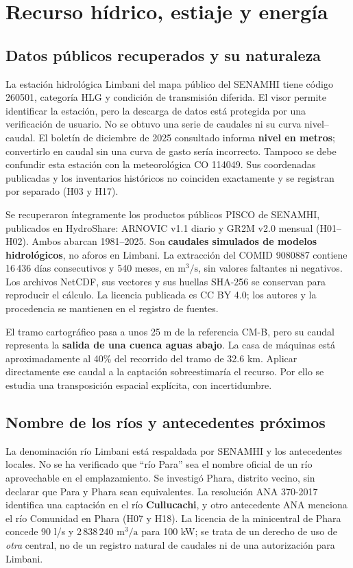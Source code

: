 \chapter{Recurso hídrico, estiaje y energía}
\section{Datos públicos recuperados y su naturaleza}
La estación hidrológica Limbani del mapa público del SENAMHI tiene código 260501, categoría HLG y condición de transmisión diferida. El visor permite identificar la estación, pero la descarga de datos está protegida por una verificación de usuario. No se obtuvo una serie de caudales ni su curva nivel--caudal. El boletín de diciembre de 2025 consultado informa \textbf{nivel en metros}; convertirlo en caudal sin una curva de gasto sería incorrecto. Tampoco se debe confundir esta estación con la meteorológica CO 114049. Sus coordenadas publicadas y los inventarios históricos no coinciden exactamente y se registran por separado (H03 y H17).

Se recuperaron íntegramente los productos públicos PISCO de SENAMHI, publicados en HydroShare: ARNOVIC v1.1 diario y GR2M v2.0 mensual (H01--H02). Ambos abarcan 1981--2025. Son \textbf{caudales simulados de modelos hidrológicos}, no aforos en Limbani. La extracción del COMID 9080887 contiene 16\,436 días consecutivos y 540 meses, en \(\mathrm{m^3/s}\), sin valores faltantes ni negativos. Los archivos NetCDF, sus vectores y sus huellas SHA-256 se conservan para reproducir el cálculo. La licencia publicada es CC BY 4.0; los autores y la procedencia se mantienen en el registro de fuentes.

El tramo cartográfico pasa a unos 25 m de la referencia CM-B, pero su caudal representa la \textbf{salida de una cuenca aguas abajo}. La casa de máquinas está aproximadamente al 40\% del recorrido del tramo de 32.6 km. Aplicar directamente ese caudal a la captación sobreestimaría el recurso. Por ello se estudia una transposición espacial explícita, con incertidumbre.

\section{Nombre de los ríos y antecedentes próximos}
La denominación río Limbani está respaldada por SENAMHI y los antecedentes locales. No se ha verificado que ``río Para'' sea el nombre oficial de un río aprovechable en el emplazamiento. Se investigó Phara, distrito vecino, sin declarar que Para y Phara sean equivalentes. La resolución ANA 370-2017 identifica una captación en el río \textbf{Cullucachi}, y otro antecedente ANA menciona el río Comunidad en Phara (H07 y H18). La licencia de la minicentral de Phara concede 90 l/s y 2\,838\,240 \(\mathrm{m^3/a}\) para 100 kW; se trata de un derecho de uso de \emph{otra} central, no de un registro natural de caudales ni de una autorización para Limbani.

